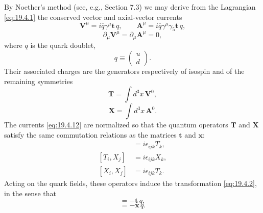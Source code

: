 By Noether's method (see, e.g., Section 7.3) we may derive from the Lagrangian \eqref{eq:19.4.1} the conserved vector and axial-vector currents
\begin{equation}
\mathbf{V}^\mu=i\bar q\gamma^\mu\mathbf{t}\,q,
\qquad
\mathbf{A}^\mu=i\bar q\gamma^\mu\gamma_5\mathbf{t}\,q,
\tag{19.4.12}\label{eq:19.4.12}
\end{equation}
\begin{equation}
\partial_\mu\mathbf{V}^\mu=\partial_\mu\mathbf{A}^\mu=0,
\tag{19.4.13}\label{eq:19.4.13}
\end{equation}
where $q$ is the quark doublet,
\begin{equation}
q\equiv\begin{pmatrix}u\\d\end{pmatrix}.
\tag{19.4.14}\label{eq:19.4.14}
\end{equation}
Their associated charges are the generators respectively of isospin and of the remaining symmetries
\begin{equation}
\mathbf{T}=\int d^3x\,\mathbf{V}^0,
\tag{19.4.15}\label{eq:19.4.15}
\end{equation}
\begin{equation}
\mathbf{X}=\int d^3x\,\mathbf{A}^0.
\tag{19.4.16}\label{eq:19.4.16}
\end{equation}
The currents \eqref{eq:19.4.12} are normalized so that the quantum operators $\mathbf{T}$ and $\mathbf{X}$ satisfy the same commutation relations as the matrices $\mathbf{t}$ and $\mathbf{x}$:
\begin{align}
[T_i,T_j]&=i\epsilon_{ijk}T_k,
\tag{19.4.17}\label{eq:19.4.17}\\
[T_i,X_j]&=i\epsilon_{ijk}X_k,
\tag{19.4.18}\label{eq:19.4.18}\\
[X_i,X_j]&=i\epsilon_{ijk}T_k.
\tag{19.4.19}\label{eq:19.4.19}
\end{align}
Acting on the quark fields, these operators induce the transformation \eqref{eq:19.4.2}, in the sense that
\begin{equation}
[\mathbf{T},q]=-\mathbf{t}\,q,
\tag{19.4.20}\label{eq:19.4.20}
\end{equation}
\begin{equation}
[\mathbf{X},q]=-\mathbf{x}\,q.
\tag{19.4.21}\label{eq:19.4.21}
\end{equation}


